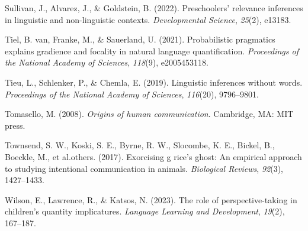 \documentclass[
  man,floatsintext]{apa6}
\newlength{\cslhangindent}
\newenvironment{CSLReferences}[2] %
 {\begin{list}{}{%
  \setlength{\itemindent}{0pt}
  \setlength{\leftmargin}{0pt}
  \setlength{\parsep}{0pt}
  \ifodd #1
   \setlength{\leftmargin}{\cslhangindent}
   \setlength{\itemindent}{-1\cslhangindent}
  \fi
  \setlength{\itemsep}{#2\baselineskip}}}
 {\end{list}}
\begin{document}
\begin{CSLReferences}{1}{0}
Sullivan, J., Alvarez, J., \& Goldstein, B. (2022). Preschoolers' relevance inferences in linguistic and non-linguistic contexts. \emph{Developmental Science}, \emph{25}(2), e13183.

Tiel, B. van, Franke, M., \& Sauerland, U. (2021). Probabilistic pragmatics explains gradience and focality in natural language quantification. \emph{Proceedings of the National Academy of Sciences}, \emph{118}(9), e2005453118.

Tieu, L., Schlenker, P., \& Chemla, E. (2019). Linguistic inferences without words. \emph{Proceedings of the National Academy of Sciences}, \emph{116}(20), 9796--9801.

Tomasello, M. (2008). \emph{Origins of human communication}. Cambridge, MA: MIT press.

Townsend, S. W., Koski, S. E., Byrne, R. W., Slocombe, K. E., Bickel, B., Boeckle, M., et al.others. (2017). Exorcising g rice's ghost: An empirical approach to studying intentional communication in animals. \emph{Biological Reviews}, \emph{92}(3), 1427--1433.

Wilson, E., Lawrence, R., \& Katsos, N. (2023). The role of perspective-taking in children's quantity implicatures. \emph{Language Learning and Development}, \emph{19}(2), 167--187.

\end{CSLReferences}
\end{document}

